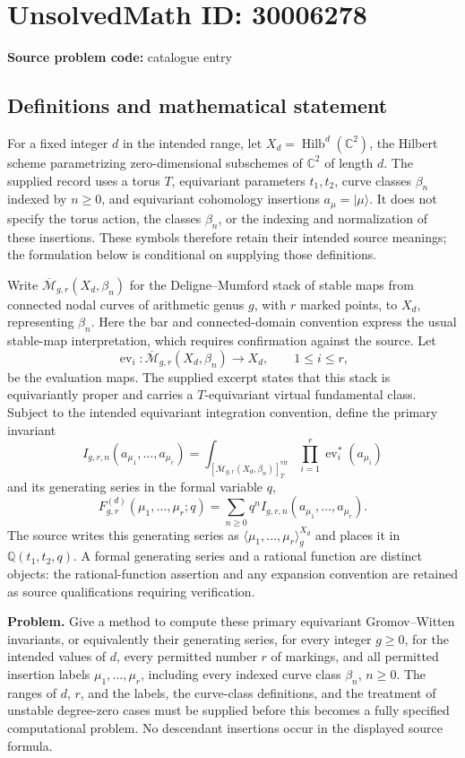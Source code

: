 \documentclass[11pt]{article}
\newcommand{\Q}{\mathbb{Q}}
\newcommand{\C}{\mathbb{C}}
\begin{document}
\section*{UnsolvedMath ID: 30006278}
\textbf{Source problem code:} catalogue entry
\subsection{Definitions and mathematical statement}
For a fixed integer \(d\) in the intended range, let \(X_d=\operatorname{Hilb}^{d}(\C^{2})\), the Hilbert scheme parametrizing zero-dimensional subschemes of \(\C^{2}\) of length \(d\). The supplied record uses a torus \(T\), equivariant parameters \(t_1,t_2\), curve classes \(\beta_n\) indexed by \(n\geq 0\), and equivariant cohomology insertions \(a_{\mu}=|\mu\rangle\). It does not specify the torus action, the classes \(\beta_n\), or the indexing and normalization of these insertions. These symbols therefore retain their intended source meanings; the formulation below is conditional on supplying those definitions.

Write \(\overline{\mathcal M}_{g,r}(X_d,\beta_n)\) for the Deligne--Mumford stack of stable maps from connected nodal curves of arithmetic genus \(g\), with \(r\) marked points, to \(X_d\), representing \(\beta_n\). Here the bar and connected-domain convention express the usual stable-map interpretation, which requires confirmation against the source. Let
\[
\operatorname{ev}_i:\overline{\mathcal M}_{g,r}(X_d,\beta_n)\longrightarrow X_d,
\qquad 1\leq i\leq r,
\]
be the evaluation maps. The supplied excerpt states that this stack is equivariantly proper and carries a \(T\)-equivariant virtual fundamental class. Subject to the intended equivariant integration convention, define the primary invariant
\[
I_{g,r,n}(a_{\mu_1},\ldots,a_{\mu_r})
=
\int_{[\overline{\mathcal M}_{g,r}(X_d,\beta_n)]^{\mathrm{vir}}_T}
\prod_{i=1}^{r}\operatorname{ev}_i^{*}(a_{\mu_i})
\]
and its generating series in the formal variable \(q\),
\[
F_{g,r}^{(d)}(\mu_1,\ldots,\mu_r;q)
=
\sum_{n\geq0}q^n I_{g,r,n}(a_{\mu_1},\ldots,a_{\mu_r}).
\]
The source writes this generating series as \(\langle\mu_1,\ldots,\mu_r\rangle_g^{X_d}\) and places it in \(\Q(t_1,t_2,q)\). A formal generating series and a rational function are distinct objects: the rational-function assertion and any expansion convention are retained as source qualifications requiring verification.

\textbf{Problem.} Give a method to compute these primary equivariant Gromov--Witten invariants, or equivalently their generating series, for every integer \(g\geq0\), for the intended values of \(d\), every permitted number \(r\) of markings, and all permitted insertion labels \(\mu_1,\ldots,\mu_r\), including every indexed curve class \(\beta_n\), \(n\geq0\). The ranges of \(d\), \(r\), and the labels, the curve-class definitions, and the treatment of unstable degree-zero cases must be supplied before this becomes a fully specified computational problem. No descendant insertions occur in the displayed source formula.
\end{document}
